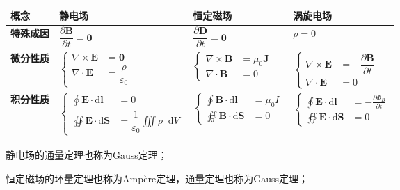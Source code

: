 \documentclass[UTF8,fontset=fandol,zihao=5]{ctexart}
\newcommand{\vect}[1]{\bm{#1}}
\newcommand{\dif}{\mathop{}\!\mathrm{d}}
\begin{document}
  \begin{center}
  \begin{tabularx}{0.98\textwidth}{>{\bfseries}p{1.5cm}X X X}
  \toprule
  概念& 静电场 & 恒定磁场 & 涡旋电场 \\
  \midrule
  特殊成因 & $\dfrac{\partial \vect B}{\partial t} = \vect 0$ & $\dfrac{\partial \vect D}{\partial t} = \vect 0$ & $\rho = 0$ \\[12pt]

  微分性质 & 
  $\left\{\begin{aligned}
  \nabla\times\vect{E}&=\vect{0} \\
  \nabla\cdot\vect{E}&=\dfrac{\rho}{\varepsilon_0}
  \end{aligned}\right.$ &  
  $\left\{\begin{aligned}
  \nabla\times\vect{B}&=\mu_0 \vect{J} \\
  \nabla\cdot\vect{B}&=0
  \end{aligned}\right.$ &
  $\left\{\begin{aligned}
  \nabla\times\vect{E}&=-\dfrac{\partial\vect{B}}{\partial t} \\
  \nabla\cdot\vect{E}&=0
  \end{aligned}\right.$ \\[24pt]
  
  积分性质 & 
  $\left\{\begin{aligned}
  \oint\vect{E}\cdot\mathrm{d}\vect{l}&=0\\
  \oiint\vect{E}\cdot\mathrm{d}\vect{S}&=\dfrac{1}{\varepsilon_0}\iiint\rho\dif V
  \end{aligned}\right.$ &
  $\left\{\begin{aligned}
  \oint\vect{B}\cdot\mathrm{d}\vect{l}&=\mu_0 I\\
  \oiint\vect{B}\cdot\mathrm{d}\vect{S}&=0
  \end{aligned}\right.$ &
  $\left\{\begin{aligned}
  \oint\vect{E}\cdot\mathrm{d}\vect{l}&=-\frac{\partial\varPhi_B}{\partial t}\\
  \oiint\vect{E}\cdot\mathrm{d}\vect{S}&=0
  \end{aligned}\right.$ \\
  \bottomrule
  \end{tabularx}
  \end{center}

静电场的通量定理也称为Gauss定理；

恒定磁场的环量定理也称为Ampère定理，通量定理也称为Gauss定理；
\end{document}
